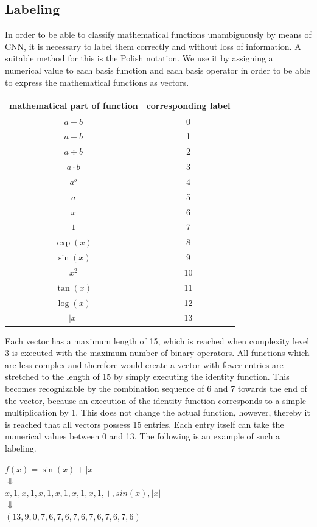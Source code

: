 \documentclass[11pt,a4paper]{scrartcl}
\begin{document}
\subsection{Labeling}
In order to be able to classify mathematical functions unambiguously by means of CNN, it is necessary to label them correctly and without loss of information. A suitable method for this is the Polish notation. We use it by assigning a numerical value to each basis function and each basis operator in order to be able to express the mathematical functions as vectors.\\
\begin{center}
	\begin{tabular}{c|c}
  		\textbf{mathematical part of function} & \textbf{corresponding label}\\
  		\hline
  		\(a+b \) & 0 \\
  		\(a-b \) & 1 \\
 		\(a \div b \) & 2 \\
  	    \(a \cdot b \) & 3 \\
  	    \( a^b \) & 4 \\
  	    \( a \) & 5 \\
  	    \( x \) & 6 \\
  		\( 1 \) & 7 \\
  		\( \exp(x) \) & 8 \\
  		\( \sin(x) \) & 9 \\
  		\( x^2 \) & 10 \\
  		\( \tan(x) \) & 11 \\
  		\( \log(x) \) & 12\\
  		\( |x| \) &13 \\
	\end{tabular}
\end{center}
\vspace*{0.5cm}
Each vector has a maximum length of 15, which is reached when complexity level 3 is executed with the maximum number of binary operators. All functions which are less complex and therefore would create a vector with fewer entries are stretched to the length of 15 by simply executing the identity function. This becomes recognizable by the combination sequence of 6 and 7 towards the end of the vector, because an execution of the identity function corresponds to a simple multiplication by 1. This does not change the actual function, however, thereby it is reached that all vectors possess 15 entries. Each entry itself can take the numerical values between 0 and 13. The following is an example of such a labeling.\\
\begin{center}
	\(f(x) = \sin(x)+|x|\) \\
	$\Downarrow$ \\ 
	\(x,1,x,1,x,1,x,1,x,1,x,1,+,sin(x),|x|\)\\
	$\Downarrow$ \\ 
	\( (13,9,0,7,6,7,6,7,6,7,6,7,6,7,6) \)\\
\end{center}
\end{document}
